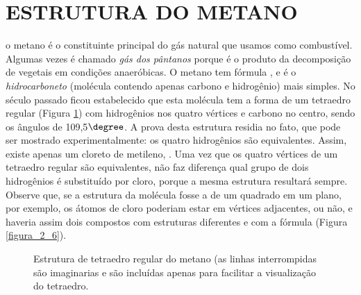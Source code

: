 \section{ESTRUTURA DO METANO}

o metano é o constituinte principal do gás natural que usamos como combustível. Algumas vezes é chamado \textit{gás dos pântanos} porque é o produto da decomposição de vegetais em condições anaeróbicas. O metano tem fórmula , e é o \textit{hidrocarboneto} (molécula contendo apenas carbono e hidrogênio) mais simples. No século passado ficou estabelecido que esta molécula tem a forma de um tetraedro regular (Figura \ref{figura_2_5}) com hidrogênios nos quatro vértices e carbono no centro, sendo os ângulos  de 109,5$\degree$. A prova desta estrutura residia no fato, que pode ser mostrado experimentalmente: os quatro hidrogênios são equivalentes. Assim, existe apenas um cloreto de metileno, . Uma vez que os quatro vértices de um tetraedro regular são equivalentes, não faz diferença qual grupo de dois hidrogênios é substituído por cloro, porque a mesma estrutura resultará sempre. Observe que, se a estrutura da molécula fosse a de um quadrado em um plano, por exemplo, os átomos de cloro poderiam estar em vértices adjacentes, ou não, e haveria assim dois compostos com estruturas diferentes e com a fórmula  (Figura \ref{figura_2_6}).

\begin{figure}[H]
    \centering
    \caption{Estrutura de tetraedro regular do metano (as linhas interrompidas são imaginarias e são incluídas apenas para facilitar a visualização do tetraedro.}
    \label{figura_2_5}
\end{figure}

